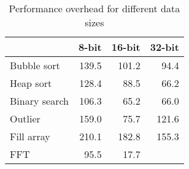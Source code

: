 \begin{table}
\caption{Performance overhead for different data sizes}
\label{tbl-performance-8-16-32-bit}
    \begin{tabular}{lrrr} %
    \toprule
                   &   8-bit  &  16-bit  &     32-bit \\
    \midrule
    \midrule
    Bubble sort    &    139.5 &    101.2 &       94.4 \\
    Heap sort      &    128.4 &     88.5 &       66.2 \\
    Binary search  &    106.3 &     65.2 &       66.0 \\
    Outlier        &    159.0 &     75.7 &      121.6 \\
    Fill array     &    210.1 &    182.8 &      155.3 \\
    FFT            &     95.5 &     17.7 &            \\
    \bottomrule
    \end{tabular}
\end{table}
